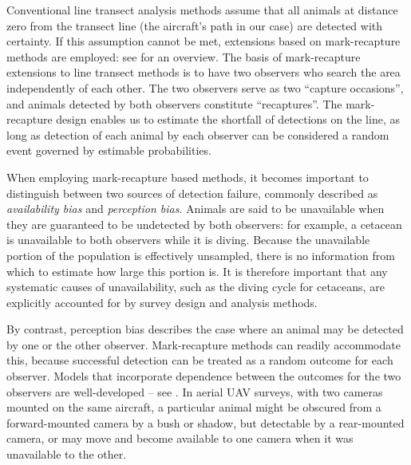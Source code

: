 \documentclass[useAMS, usenatbib, referee]{biom}\usepackage[]{graphicx}\usepackage[]{color}
\begin{document}
Conventional line transect analysis methods assume that all animals at distance zero from the transect line (the aircraft's path in our case) are detected with certainty. If this assumption cannot be met, extensions based on mark-recapture methods are employed: see \cite{Burt+al:14} for an overview. The basis of mark-recapture extensions to line transect methods is to have two observers who search the area independently of each other. The two observers serve as two ``capture occasions'', and animals detected by both observers constitute ``recaptures''. The mark-recapture design enables us to estimate the shortfall of detections on the line, as long as detection of each animal by each observer can be considered a random event governed by estimable probabilities.

When employing mark-recapture based methods, it becomes important to distinguish between two sources of detection failure, commonly described as {\em availability bias} and {\em perception bias}. Animals are said to be unavailable when they are guaranteed to be undetected by both observers: for example, a cetacean is unavailable to both observers while it is diving. Because the unavailable portion of the population is effectively unsampled, there is no information from which to estimate how large this portion is. It is therefore important that any systematic causes of unavailability, such as the diving cycle for cetaceans, are explicitly accounted for by survey design and analysis methods.

By contrast, perception bias describes the case where an animal may be detected by one or the other observer. Mark-recapture methods can readily accommodate this, because successful detection can be treated as a random outcome for each observer. Models that incorporate dependence between the outcomes for the two observers are well-developed -- see \cite{Laake:99, Borchers+al:06, Buckland+al:10}. In aerial UAV surveys, with two cameras mounted on the same aircraft, a particular animal might be obscured from a forward-mounted camera by a bush or shadow, but detectable by a rear-mounted camera, or may move and become available to one camera when it was unavailable to the other. 
\end{document}
